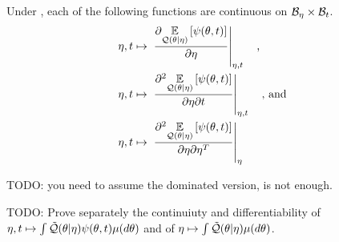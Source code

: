 



\begin{lem}

Under , each of the following functions
are continuous on $\mathcal{B}_\eta \times \mathcal{B}_t$.
%
\begin{align*}
%
\eta, \t \mapsto{}& \fracat{\partial
\expect{\q(\theta \vert \eta)} {\psi(\theta, \t)}}{\partial \eta}{\eta, \t}
%
\mathtxt{,}\\
%
\eta, \t \mapsto{}& \fracat{\partial^2
\expect{\q(\theta \vert \eta)} {\psi(\theta, \t)}}{\partial \eta \partial
\t}{\eta, \t}
%
\mathtxt{, and}\\
%
\eta, \t \mapsto{}&  \fracat{\partial^2
\expect{\q(\theta \vert \eta)} {\psi(\theta, \t)}}{\partial \eta \partial
\eta^T}{\eta}
%
\end{align*}
%
\end{lem}

TODO: you need to assume the dominated version, 
is not enough.

TODO: Prove separately the continuiuty and differentiability of $\eta, t
\mapsto \int \tilde{\mathcal{Q}}(\theta \vert \eta) \psi(\theta, t) \mu(d\theta)$ and of
$\eta \mapsto \int \tilde{\mathcal{Q}}(\theta \vert \eta) \mu(d\theta)$.


